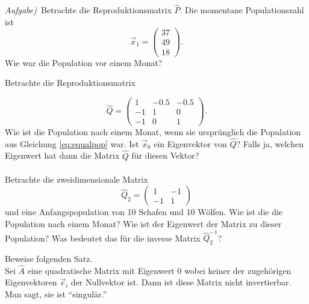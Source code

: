   \emph{Aufgabe)}\ Betrachte die Reproduktionsmatrix $\hat P$. Die
   momentane Populationszahl ist 
   \begin{equation}
       \vec x_1 = \left(\begin{matrix}
               37\\
               49\\
               18
           \end{matrix}\right).
   \end{equation}
   Wie war die Population vor einem Monat?

 \subexercise[%
     topic={Eigenpopulationen},
    ]

    Betrachte die Reproduktionsmatrix 

  \begin{equation}
      \hat Q = 
      \left(
      \begin{matrix}
          1    & -0.5   & -0.5 \\
          -1  & 1 & 0 \\
          -1  & 0   & 1 
      \end{matrix}
  \right).
   \end{equation}
   Wie ist die Population nach einem Monat, wenn sie urspr\"unglich die
   Population aus Gleichung \ref{eq:equalpop} war. Ist $\vec x_0$ ein
   Eigenvektor von $\hat Q$? Falls ja, welchen Eigenwert hat dann die
   Matrix $\hat Q$ f\"ur diesen Vektor?\\\ \\
   Betrachte die zweidimensionale Matrix
  \begin{equation}
      \hat Q_2 = 
      \left(
      \begin{matrix}
          1    & -1 \\
          -1  & 1
      \end{matrix}
  \right)
   \end{equation}
   und eine Anfangspopulation von 10 Schafen und 10 W\"olfen. Wie ist
   die die Population nach einem Monat? Wie ist der Eigenwert der Matrix
   zu dieser Population? Was bedeutet das f\"ur die inverse Matrix $\hat
   Q_2^{-1}$?
   
    \subexercise[%
     topic={Inverse eine singul\"aren Matrix},
    ]
    Beweise folgenden Satz.\ \\

    Sei $\hat A$ eine quadratische Matrix mit Eigenwert 0 wobei keiner
    der
    zugeh\"origen Eigenvektoren $\vec e_i$ der Nullvektor ist.
    Dann ist diese Matrix nicht invertierbar. Man sagt, sie ist
    ``singul\"ar.''


